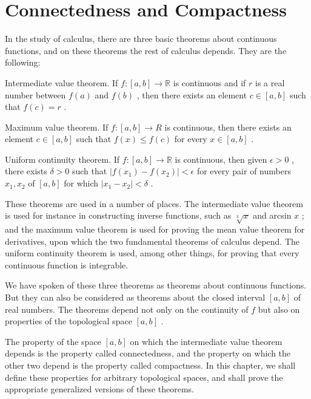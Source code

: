 \chapter{Connectedness and Compactness}

In the study of calculus, there are three basic theorems about continuous functions, and on these theorems the rest of calculus depends. They are the following:

Intermediate value theorem. If \(f : \left\lbrack  {a,b}\right\rbrack   \rightarrow  \mathbb{R}\) is continuous and if \(r\) is a real number between \(f\left( a\right)\) and \(f\left( b\right)\) , then there exists an element \(c \in  \left\lbrack  {a,b}\right\rbrack\) such that \(f\left( c\right)  = r\) .

Maximum value theorem. If \(f : \left\lbrack  {a,b}\right\rbrack   \rightarrow  R\) is continuous, then there exists an element \(c \in  \left\lbrack  {a,b}\right\rbrack\) such that \(f\left( x\right)  \leq  f\left( c\right)\) for every \(x \in  \left\lbrack  {a,b}\right\rbrack\) .

Uniform continuity theorem. If \(f : \left\lbrack  {a,b}\right\rbrack   \rightarrow  \mathbb{R}\) is continuous, then given \(\epsilon  > 0\) , there exists \(\delta  > 0\) such that \(\left| {f\left( {x}_{1}\right)  - f\left( {x}_{2}\right) }\right|  < \epsilon\) for every pair of numbers \({x}_{1},{x}_{2}\) of \(\left\lbrack  {a,b}\right\rbrack\) for which \(\left| {{x}_{1} - {x}_{2}}\right|  < \delta\) .

These theorems are used in a number of places. The intermediate value theorem is used for instance in constructing inverse functions, such as \(\sqrt[3]{x}\) and arcsin \(x\) ; and the maximum value theorem is used for proving the mean value theorem for derivatives, upon which the two fundamental theorems of calculus depend. The uniform continuity theorem is used, among other things, for proving that every continuous function is integrable.

We have spoken of these three theorems as theorems about continuous functions. But they can also be considered as theorems about the closed interval \(\left\lbrack  {a,b}\right\rbrack\) of real numbers. The theorems depend not only on the continuity of \(f\) but also on properties of the topological space \(\left\lbrack  {a,b}\right\rbrack\) .

The property of the space \(\left\lbrack  {a,b}\right\rbrack\) on which the intermediate value theorem depends is the property called connectedness, and the property on which the other two depend is the property called compactness. In this chapter, we shall define these properties for arbitrary topological spaces, and shall prove the appropriate generalized versions of these theorems.

